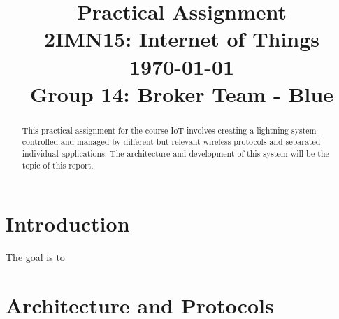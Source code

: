 \documentclass[conference]{IEEEtran}
\begin{document}
\title{Practical Assignment\\ {\fontsize{13}{0}\selectfont 2IMN15: Internet of Things } \\ {\fontsize{13}{0}\selectfont \today }\\{ \fontsize{13}{0}\selectfont Group 14: Broker Team - Blue}}

\author{
	\and
	}
\maketitle

\IEEEpeerreviewmaketitle


\begin{abstract}
	This practical assignment for the course IoT involves creating a lightning system controlled and managed by different but relevant wireless protocols and separated individual applications. The architecture and development of this system will be the topic of this report.\\
	
\end{abstract}


\section{Introduction}

The goal is to 



\section{Architecture and Protocols}
\end{document}
